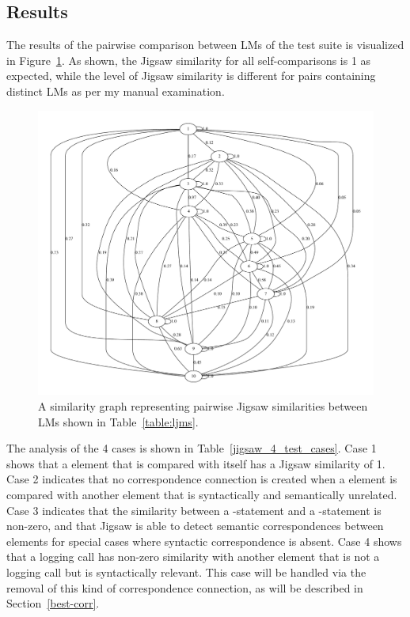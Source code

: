 \subsection{Results}  \label{study1-results}
The results of the pairwise comparison between LMs of the test suite is visualized in Figure~\ref{fig:jigsaw_graph}. As shown, the Jigsaw similarity for all self-comparisons is 1 as expected, while the level of Jigsaw similarity is different for pairs containing distinct LMs as per my manual examination.

\begin{figure}[t]
  \centering\includegraphics[width=\textwidth]{graphviz/jigsaw.pdf}
  \caption{A similarity graph representing pairwise Jigsaw similarities between LMs shown in Table~\protect\ref{table:ljms}.\label{fig:jigsaw_graph}}
\end{figure}


The analysis of the 4 cases is shown in Table~\ref{jigsaw_4_test_cases}. Case 1 shows that a  element that is compared with itself has a Jigsaw similarity of 1. Case 2 indicates that no correspondence connection is created when a  element is compared with another  element that is syntactically and semantically unrelated. Case 3 indicates that the similarity between a -statement and a -statement is non-zero, and that Jigsaw is able to detect semantic correspondences between  elements for special cases where syntactic correspondence is absent. Case 4 shows that a logging call has non-zero similarity with another  element that is not a logging call but is syntactically relevant. This case will be handled via the removal of this kind of correspondence connection, as will be described in Section~\ref{best-corr}. %



